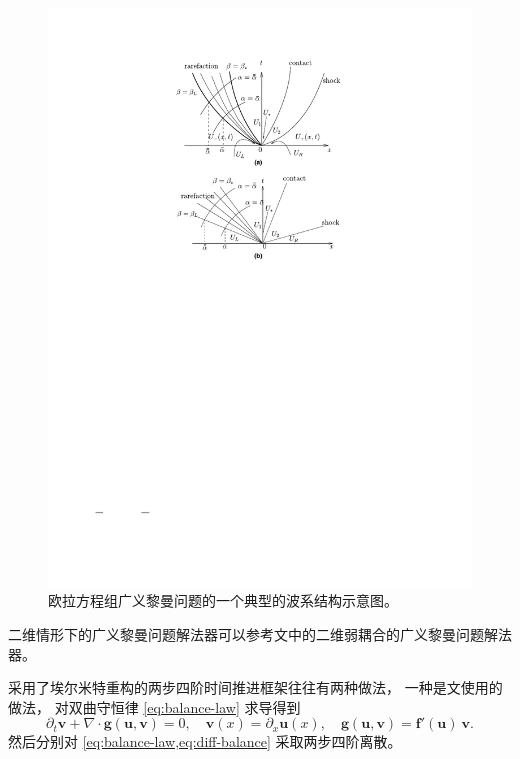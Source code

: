 \begin{figure}[htbp]
  \centering
  \includegraphics[width=\textwidth]{fig/GRP_wave_pattern.pdf}
  \caption{欧拉方程组广义黎曼问题的一个典型的波系结构示意图。
  }
  \label{fig:GRP_wave_pattern}
\end{figure}

二维情形下的广义黎曼问题解法器可以参考文\cite{GRP_qi}中的二维弱耦合的广义黎曼问题解法器。

\vspace{\baselineskip} %
采用了埃尔米特重构的两步四阶时间推进框架往往有两种做法，
一种是文\cite{Qiu-Shu-2004,S2O4_wenli}使用的做法，
对双曲守恒律 \cref{eq:balance-law} 求导得到
\begin{equation}
  \label{eq:diff-balance}
  {\partial_t}{\bm v}+\nabla \cdot{\bm g}(\bm u, \bm v)= 0, \quad
  \bm v(x)={\partial_x}\bm u(x),\quad
  \bm g(\bm u, \bm v)={\bm f}'({\bm u}) \ {\bm v}.
\end{equation}
然后分别对 \cref{eq:balance-law,eq:diff-balance} 采取两步四阶离散。

